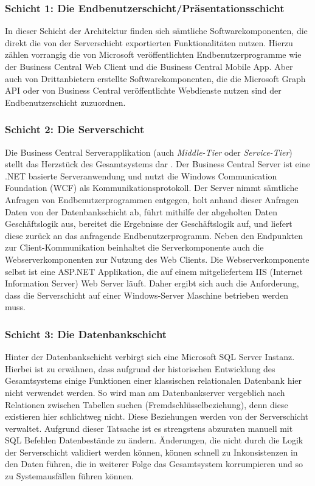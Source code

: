 \pagebreak

\subsubsection{Schicht 1: Die Endbenutzerschicht/Präsentationsschicht }
In dieser Schicht der Architektur finden sich sämtliche Softwarekomponenten, die direkt die von der Serverschicht exportierten Funktionalitäten nutzen. Hierzu zählen vorrangig die von Microsoft veröffentlichten Endbenutzerprogramme wie der Business Central Web Client und die Business Central Mobile App. Aber auch von Drittanbietern erstellte Softwarekomponenten, die die Microsoft Graph API oder von Business Central veröffentlichte Webdienste nutzen sind der Endbenutzerschicht zuzuordnen.


\subsubsection{Schicht 2: Die Serverschicht }
Die Business Central Serverapplikation (auch \textit{Middle-Tier} oder \textit{Service-Tier}) stellt das Herzstück des Gesamtsystems dar \cite{roys2009implementing}. Der Business Central Server ist eine .NET basierte Serveranwendung und nutzt die Windows Communication Foundation (WCF) als Kommunikationsprotokoll. Der Server nimmt sämtliche Anfragen von Endbenutzerprogrammen entgegen, holt anhand dieser Anfragen Daten von der Datenbankschicht ab, führt mithilfe der abgeholten Daten Geschäftslogik aus, bereitet die Ergebnisse der Geschäftslogik auf, und liefert diese zurück an das anfragende Endbenutzerprogramm. Neben den Endpunkten zur Client-Kommunikation beinhaltet die Serverkomponente auch die Webserverkomponenten zur Nutzung des Web Clients. Die Webserverkomponente selbst ist eine ASP.NET Applikation, die auf einem mitgeliefertem IIS (Internet Information Server) Web Server läuft. Daher ergibt sich auch die Anforderung, dass die Serverschicht auf einer Windows-Server Maschine betrieben werden muss.

\subsubsection{Schicht 3: Die Datenbankschicht}
Hinter der Datenbankschicht verbirgt sich eine Microsoft SQL Server Instanz. Hierbei ist zu erwähnen, dass aufgrund der historischen Entwicklung des Gesamtsystems einige Funktionen einer klassischen relationalen Datenbank hier nicht verwendet werden. So wird man am Datenbankserver vergeblich nach Relationen zwischen Tabellen suchen (Fremdschlüsselbeziehung), denn diese existieren hier schlichtweg nicht. Diese Beziehungen werden von der Serverschicht verwaltet. Aufgrund dieser Tatsache ist es strengstens abzuraten manuell mit SQL Befehlen Datenbestände zu ändern. Änderungen, die nicht durch die Logik der Serverschicht validiert werden können, können schnell zu Inkonsistenzen in den Daten führen, die in weiterer Folge das Gesamtsystem korrumpieren und so zu Systemausfällen führen können.
\linebreak

